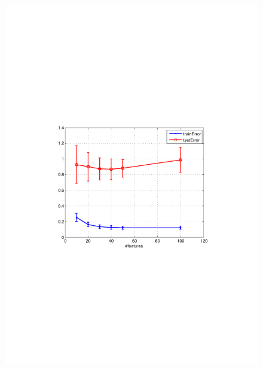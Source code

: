 \begin{figure}[h]
 \begin{minipage}{\textwidth}
  \begin{minipage}[b]{0.45\textwidth}
\centering
    \includegraphics[clip, trim=4cm 9.2cm 3.5cm 9cm, width=\textwidth]{figures/ALS_features.pdf}
    

\end{minipage}
\end{minipage}
\end{figure}
